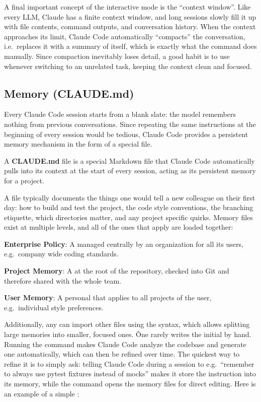 A final important concept of the interactive mode is the ``context window''. Like every LLM, Claude has a finite
context window, and long sessions slowly fill it up with file contents, command outputs, and conversation history.
When the context approaches its limit, Claude Code automatically ``compacts'' the conversation, i.e.\ replaces it
with a summary of itself, which is exactly what the  command does manually. Since compaction
inevitably loses detail, a good habit is to use  whenever switching to an unrelated task, keeping the
context clean and focused.

\subsection{Memory (CLAUDE.md)}

Every Claude Code session starts from a blank slate: the model remembers nothing from previous conversations. Since
repeating the same instructions at the beginning of every session would be tedious, Claude Code provides a persistent
memory mechanism in the form of a special file.

\bd[CLAUDE.md]
A \textbf{CLAUDE.md} file is a special Markdown file that Claude Code automatically pulls into its context at the
start of every session, acting as its persistent memory for a project.
\ed

A  file typically documents the things one would tell a new colleague on their first day: how to
build and test the project, the code style conventions, the branching etiquette, which directories matter, and any
project specific quirks. Memory files exist at multiple levels, and all of the ones that apply are loaded together:
\bit
\item \textbf{Enterprise Policy}: A  managed centrally by an organization for all its users, e.g.\
company wide coding standards.
\item \textbf{Project Memory}: A  at the root of the repository, checked into Git and therefore
shared with the whole team.
\item \textbf{User Memory}: A personal  that applies to all projects of the user, e.g.\
individual style preferences.
\eit

Additionally, any  can import other files using the  syntax, which allows
splitting large memories into smaller, focused ones. \v

One rarely writes the initial  by hand. Running the  command makes Claude Code analyze
the codebase and generate one automatically, which can then be refined over time. The quickest way to refine it is to
simply ask: telling Claude Code during a session to e.g.\ ``remember to always use pytest fixtures instead of mocks''
makes it store the instruction into its memory, while the \code{/memory} command opens the memory files for direct
editing. Here is an example of a simple \code{CLAUDE.md}:

